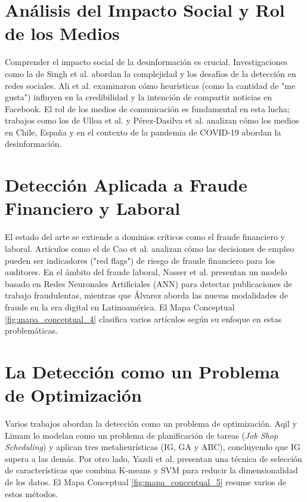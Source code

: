 \section{Análisis del Impacto Social y Rol de los Medios}
Comprender el impacto social de la desinformación es crucial. Investigaciones como la de Singh et al. \cite{singh2023comprehensive} abordan la complejidad y los desafíos de la detección en redes sociales. Ali et al. \cite{ali2021fake} examinaron cómo heurísticas (como la cantidad de "me gusta") influyen en la credibilidad y la intención de compartir noticias en Facebook. El rol de los medios de comunicación es fundamental en esta lucha; trabajos como los de Ulloa et al. \cite{carcamo2021fake} y Pérez-Dasilva et al. \cite{perez2020fake} analizan cómo los medios en Chile, España y en el contexto de la pandemia de COVID-19 abordan la desinformación.

\section{Detección Aplicada a Fraude Financiero y Laboral}
El estado del arte se extiende a dominios críticos como el fraude financiero y laboral. Artículos como el de Cao et al. \cite{cao2020corporate} analizan cómo las decisiones de empleo pueden ser indicadores ("red flags") de riesgo de fraude financiero para los auditores. En el ámbito del fraude laboral, Nasser et al. \cite{nasser2021online} presentan un modelo basado en Redes Neuronales Artificiales (ANN) para detectar publicaciones de trabajo fraudulentas, mientras que Álvarez \cite{alvarez2021fraude} aborda las nuevas modalidades de fraude en la era digital en Latinoamérica. El Mapa Conceptual \ref{fig:mapa_conceptual_4} clasifica varios artículos según su enfoque en estas problemáticas.

\section{La Detección como un Problema de Optimización}
Varios trabajos abordan la detección como un problema de optimización. Aqil y Limam \cite{aqil2021modeling} lo modelan como un problema de planificación de tareas (\textit{Job Shop Scheduling}) y aplican tres metaheurísticas (IG, GA y ABC), concluyendo que IG supera a las demás. Por otro lado, Yazdi et al. \cite{yazdi2020improving} presentan una técnica de selección de características que combina K-means y SVM para reducir la dimensionalidad de los datos. El Mapa Conceptual \ref{fig:mapa_conceptual_5} resume varios de estos métodos.

